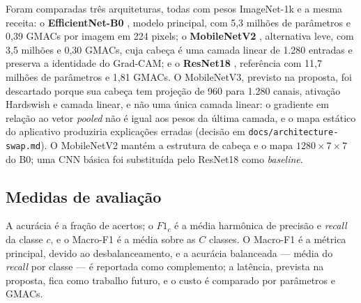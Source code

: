 \documentclass[11pt,a4paper]{article}
\begin{document}
	Foram comparadas três arquiteturas, todas com pesos ImageNet-1k e a mesma receita: o \textbf{EfficientNet-B0} \cite{tan2019}, modelo principal, com 5,3 milhões de parâmetros e 0,39 GMACs por imagem em 224 pixels; o \textbf{MobileNetV2} \cite{sandler2018}, alternativa leve, com 3,5 milhões e 0,30 GMACs, cuja cabeça é uma camada linear de 1.280 entradas e preserva a identidade do Grad-CAM; e o \textbf{ResNet18} \cite{he2016}, referência com 11,7 milhões de parâmetros e 1,81 GMACs. O MobileNetV3, previsto na proposta, foi descartado porque sua cabeça tem projeção de 960 para 1.280 canais, ativação Hardswish e camada linear, e não uma única camada linear: o gradiente em relação ao vetor \emph{pooled} não é igual aos pesos da última camada, e o mapa estático do aplicativo produziria explicações erradas (decisão em \texttt{docs/\allowbreak architecture-swap.md}). O MobileNetV2 mantém a estrutura de cabeça e o mapa $1280 \times 7 \times 7$ do B0; uma CNN básica foi substituída pelo ResNet18 como \emph{baseline}.
	
	\subsection{Medidas de avaliação}
	\label{sec:metricas}
	
	A acurácia é a fração de acertos; o $F1_c$ é a média harmônica de precisão e \emph{recall} da classe $c$, e o Macro-F1 é a média sobre as $C$ classes. O Macro-F1 é a métrica principal, devido ao desbalanceamento, e a acurácia balanceada --- média do \emph{recall} por classe --- é reportada como complemento; a latência, prevista na proposta, fica como trabalho futuro, e o custo é comparado por parâmetros e GMACs.
	
\end{document}
